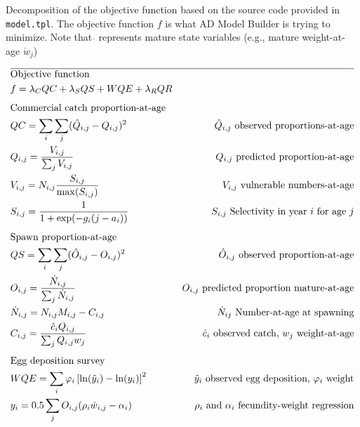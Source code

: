\documentclass[12pt,letterpaper]{article}
\newcounter{saveEq}
\def\putEq{\setcounter{saveEq}{\value{equation}}}
\def\tableEq{ %
    \putEq \setcounter{equation}{0}
    \renewcommand{\theequation}{T\arabic{table}.\arabic{equation}}
    \vspace{-5mm}
    }
\begin{document}
    \begin{table}[ht]
      \centering
      \caption{Decomposition of the objective function based on the source code provided in \texttt{model.tpl}. The objective function $f$ is what AD Model Builder is trying to minimize. Note that $\dot{}$ represents mature state variables (e.g., mature weight-at-age $\dot{w}_j$)}
      \label{tab:ModelDeconstruction}
      \tableEq
      \begin{align}
        \hline \nonumber
        &\mbox{Objective function} & \nonumber\\
        & f = \lambda_C QC + \lambda_S QS + WQE + \lambda_R QR & \label{eq.f} \\[1ex]
        &\mbox{Commercial catch proportion-at-age}  \nonumber\\
        & QC = \sum_i \sum_j (\hat{Q}_{i,j} - Q_{i,j})^2 & \mbox{$\hat{Q}_{i,j}$ observed proportions-at-age} \label{eq.SSQC}\\
        & Q_{i,j} = \frac{V_{i,j}}{\sum_j V_{i,j}} & \mbox{$Q_{i,j}$ predicted proportion-at-age} \label{eq.Qij} \\
        & V_{i,j} = N_{i,j} \frac{S_{i,j}}{\max(S_{i,j})} & \mbox{$V_{i,j}$ vulnerable numbers-at-age} \label{eq.Vij}\\
        & S_{i,j} = \frac{1}{1+\exp(-g_i(j-a_i))} &\mbox{$S_{i,j}$ Selectivity in year $i$ for age $j$} \label{eq.Sij} \\[1ex]
        &\mbox{Spawn proportion-at-age} \nonumber\\
        & QS = \sum_i \sum_j (\hat{O}_{i,j}-O_{i,j})^2 &  \mbox{$\hat{O}_{i,j}$ observed proportion-at-age} \label{eq.QS}\\
        & O_{i,j} = \frac{\dot{N}_{i,j}}{\sum_j \dot{N}_{i,j} } & \mbox{$O_{i,j}$ predicted proportion mature-at-age} \label{eq.Oij}\\
        & \dot{N}_{i,j} = N_{i,j} M_{i,j} - C_{i,j} & \mbox{$\dot{N}_{ij}$  Number-at-age at spawning} \\
        & C_{i,j} = \frac{\hat{c}_i Q_{i,j}}{\sum_j Q_{i,j} w_j} & \mbox{$\hat{c}_i$ observed catch, $w_j$ weight-at-age} \label{eq.Cij}\\[1ex]
        &\mbox{Egg deposition survey} \nonumber\\
        & WQE = \sum_i \varphi_i\left[ \ln(\hat{y}_i)-\ln(y_i) \right]^2 & \mbox{$\hat{y}_i$ observed egg deposition, $\varphi_i$ weight}\label{eq.WQE}\\
        & y_i = 0.5 \sum_j O_{i,j} (\rho_i \dot{w}_{i,j}-\alpha_i) &\mbox{$\rho_i$ and $\alpha_i$ fecundity-weight regression} \\

\end{align}
\end{table}
\end{document}
